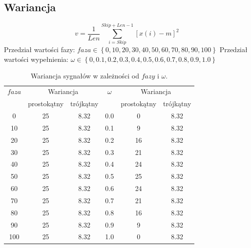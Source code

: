 \documentclass[wide,a4paper,titlepage,12pt]{mwart}
\begin{document}
    \subsection{Wariancja}
      \begin{displaymath}
        v = \frac{1}{Len} \sum^{Skip+Len-1}_{i=Skip} [x(i)-m]^2
      \end{displaymath}
      Przedział wartości fazy: $faza \in \left \{0,10,20,30,40,50,60,70,80,90,100\right \}$
      \newline
      Przedział wartości wypełnienia: $\omega \in \left \{0, 0.1, 0.2, 0.3, 0.4, 0.5, 0.6, 0.7, 0.8, 0.9, 1.0\right \}$
      \newline
      
      \begin{table}[h]
        \begin{center}
          \begin{tabular}{|c|c|c|c|c|c|}
            \hline
              $faza$ &
              \multicolumn{2}{|c|}{Wariancja} &
              $\omega$ &
              \multicolumn{2}{|c|}{Wariancja} \\
               & prostokątny & trójkątny & & prostokątny & trójkątny \\
            \hline
              0   & 25 & 8.32   & 0.0 & 0  & 8.32 \\
              10  & 25 & 8.32   & 0.1 & 9  & 8.32 \\
              20  & 25 & 8.32   & 0.2 & 16 & 8.32 \\
              30  & 25 & 8.32   & 0.3 & 21 & 8.32 \\
              40  & 25 & 8.32   & 0.4 & 24 & 8.32 \\
              50  & 25 & 8.32   & 0.5 & 25 & 8.32 \\
              60  & 25 & 8.32   & 0.6 & 24 & 8.32 \\
              70  & 25 & 8.32   & 0.7 & 21 & 8.32 \\
              80  & 25 & 8.32   & 0.8 & 16 & 8.32 \\
              90  & 25 & 8.32   & 0.9 & 9  & 8.32 \\
              100 & 25 & 8.32   & 1.0 & 0  & 8.32 \\
            \hline
          \end{tabular}
        
          \caption{Wariancja sygnałów w zależności od $fazy$ i $\omega$.}
        \end{center}
      \end{table}
      
\end{document}

